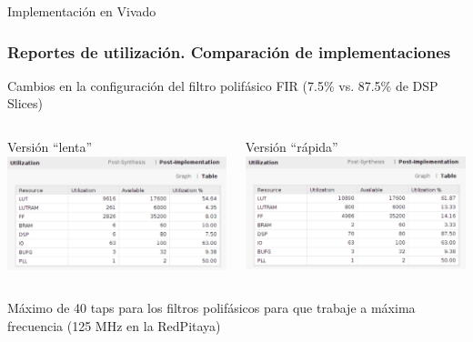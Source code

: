 \documentclass[ignorenonframetext,12pt]{beamer}
\begin{document}
\begin{frame}{Implementación en Vivado}
				\frametitle{Reportes de utilización. Comparación de implementaciones}
				Cambios en la configuración del filtro polifásico FIR (7.5\% vs. 87.5\%
				de DSP Slices)

				\begin{columns}
								\begin{column}{0.5\textwidth}{{\color{blue}Versión ``lenta''}}
												\includegraphics[width=\textwidth]{utilization_table}
								\end{column}
								\begin{column}{0.5\textwidth}{{\color{blue}Versión ``rápida''}}
												\includegraphics[width=\textwidth]{reporte_vivado_fast_rxch16}
								\end{column}
				\end{columns}
				\alert{Máximo de 40 taps para los filtros polifásicos para que trabaje a
				máxima frecuencia (125 MHz en la RedPitaya)}
\end{frame}
\end{document}
